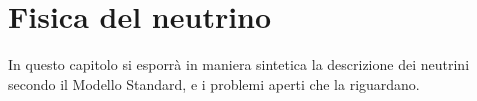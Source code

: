 \documentclass[../../main.tex]{subfiles}
\begin{document}
\section{Fisica del neutrino} \label{sec:fisica-del-neutrino}
  In questo capitolo si esporrà in maniera sintetica la descrizione dei
  neutrini secondo il Modello Standard, e i problemi aperti che la riguardano.

  
\end{document}
